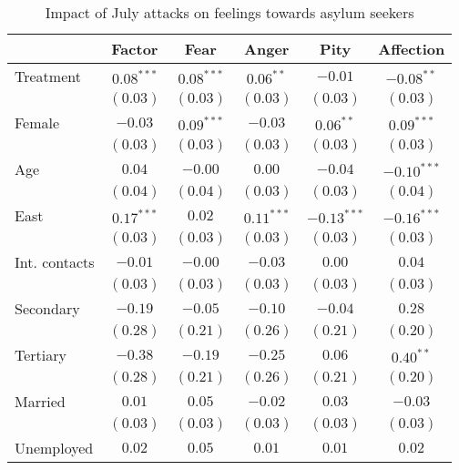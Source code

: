 
\begin{table}
\caption{Impact of July attacks on feelings towards asylum seekers}
\begin{center}
\begin{tabular}{l c c c c c}
\toprule
 & Factor & Fear & Anger & Pity & Affection \\
\midrule
Treatment     & $0.08^{***}$ & $0.08^{***}$ & $0.06^{**}$  & $-0.01$       & $-0.08^{**}$  \\
              & $(0.03)$     & $(0.03)$     & $(0.03)$     & $(0.03)$      & $(0.03)$      \\
Female        & $-0.03$      & $0.09^{***}$ & $-0.03$      & $0.06^{**}$   & $0.09^{***}$  \\
              & $(0.03)$     & $(0.03)$     & $(0.03)$     & $(0.03)$      & $(0.03)$      \\
Age           & $0.04$       & $-0.00$      & $0.00$       & $-0.04$       & $-0.10^{***}$ \\
              & $(0.04)$     & $(0.04)$     & $(0.03)$     & $(0.03)$      & $(0.04)$      \\
East          & $0.17^{***}$ & $0.02$       & $0.11^{***}$ & $-0.13^{***}$ & $-0.16^{***}$ \\
              & $(0.03)$     & $(0.03)$     & $(0.03)$     & $(0.03)$      & $(0.03)$      \\
Int. contacts & $-0.01$      & $-0.00$      & $-0.03$      & $0.00$        & $0.04$        \\
              & $(0.03)$     & $(0.03)$     & $(0.03)$     & $(0.03)$      & $(0.03)$      \\
Secondary     & $-0.19$      & $-0.05$      & $-0.10$      & $-0.04$       & $0.28$        \\
              & $(0.28)$     & $(0.21)$     & $(0.26)$     & $(0.21)$      & $(0.20)$      \\
Tertiary      & $-0.38$      & $-0.19$      & $-0.25$      & $0.06$        & $0.40^{**}$   \\
              & $(0.28)$     & $(0.21)$     & $(0.26)$     & $(0.21)$      & $(0.20)$      \\
Married       & $0.01$       & $0.05$       & $-0.02$      & $0.03$        & $-0.03$       \\
              & $(0.03)$     & $(0.03)$     & $(0.03)$     & $(0.03)$      & $(0.03)$      \\
Unemployed    & $0.02$       & $0.05$       & $0.01$       & $0.01$        & $0.02$        \\

\end{tabular}
\end{center}
\end{table}
